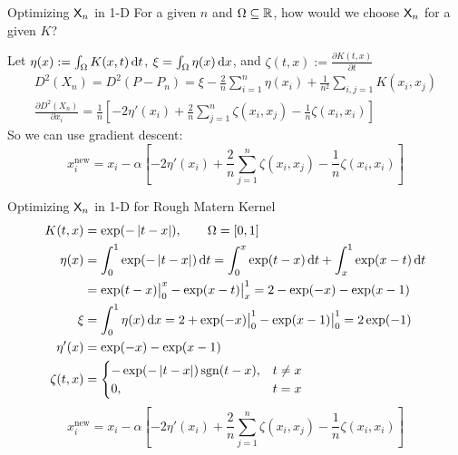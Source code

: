 \documentclass[10pt,compress,xcolor={usenames,dvipsnames},aspectratio=169]{beamer}
\begin{document}
\begin{frame}{Optimizing $\mathsf{X}_n$ in 1-D}
	For a given $n$ and $\Omega \subseteq \mathbb{R}$, how would we choose $\mathsf{X}_n$ for a given $K$?  
	
	Let $\eta(x) := \int_\Omega K(x,t) \, {\rm d} t$, $\xi = \int_\Omega \eta(x) \, {\rm d} x$, and $\zeta(t,x) := \frac{\partial K(t,x)}{\partial t}$
	\begin{gather*}
		 D^2(X_n) = D^2(P-P_n) = \xi - \frac 2{n} \sum_{i=1}^n  \eta(x_i) + \frac 1{n^2} \sum_{i,j=1}K(x_i,x_j) \\
		 \frac{\partial D^2(X_n)}{\partial x_i} = \frac {1}{n} \left [- 2\eta'(x_i)  + \frac 2{n} \sum_{j =1}^n \zeta(x_i,x_j) - \frac 1{n} \zeta(x_i,x_i) \right]
	\end{gather*}
So we can use gradient descent:
\[
x_i^{\text{new}} = x_i - \alpha \left [- 2\eta'(x_i)  + \frac 2{n} \sum_{j =1}^n \zeta(x_i,x_j) - \frac 1{n} \zeta(x_i,x_i) \right]
\]
\end{frame}

\begin{frame}{Optimizing $\mathsf{X}_n$ in 1-D for Rough Matern Kernel}
	\vspace{-5ex}
	\begin{align*}
		K(t,x) &= \exp(-\left \lvert t-x \right \rvert), \qquad \Omega = [0,1] \\
		\eta(x) &= \int_0^1 \exp(-\left \lvert t-x \right \rvert) \, {\rm d} t = \int_0^x \exp(t-x) \, {\rm d} t +  \int_x^1 \exp(x - t) \, {\rm d} t \\
		& = \exp(t-x) \bigr \rvert_0^x - \exp(x - t) \bigr\rvert_x^1 = 2  - \exp(-x) - \exp(x-1) \\
		\xi &= \int_0^1 \eta(x) \, {\rm d} x =  2 + \exp(-x) \bigr \rvert_0^1 - \exp(x-1) \bigr \rvert_0^1 = 2 \exp(-1)  \\
		\eta'(x) &= \exp(-x)  - \exp(x-1) \\
		\zeta(t,x) & = \begin{cases} -\exp(-\left \lvert t-x \right \rvert) \operatorname{sgn}(t-x) ,& t \ne x\\
			0, & t = x
		\end{cases}
	\end{align*}
	\[
	x_i^{\text{new}} = x_i - \alpha \left [ -2\eta'(x_i)  + \frac 2{n} \sum_{j =1}^n \zeta(x_i,x_j) - \frac 1{n} \zeta(x_i,x_i) \right]
	\]
\end{frame}
\end{document}
